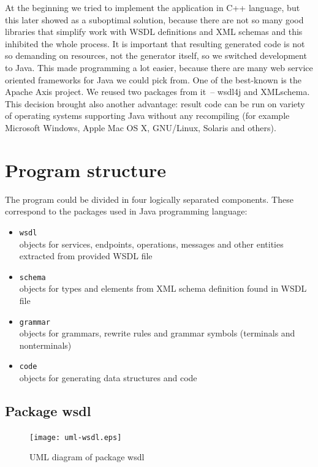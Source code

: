 \documentclass[12pt,notitlepage]{report}
\begin{document}
At the beginning we tried to implement the application in C++ language, but this later showed as a suboptimal solution, because there are not so many good libraries that simplify work with WSDL definitions and XML schemas and this inhibited the whole process. It is important that resulting generated code is not so demanding on resources, not the generator itself, so we switched development to Java. This made programming a lot easier, because there are many web service oriented frameworks for Java we could pick from. One of the best-known is the Apache Axis\cite{apache-axis} project. We reused two packages from it~-- wsdl4j and XMLschema. This decision brought also another advantage: result code can be run on variety of operating systems supporting Java without any recompiling (for example Microsoft Windows, Apple Mac OS X, GNU/Linux, Solaris and others).

\section{Program structure}
\label{program-structure}

The program could be divided in four logically separated components. These correspond to the packages used in Java programming language:

\begin{itemize}
 \item\texttt{wsdl} \\ objects for services, endpoints, operations, messages and other entities extracted from provided WSDL file
 \item\texttt{schema} \\ objects for types and elements from XML schema definition found in WSDL file
 \item\texttt{grammar} \\ objects for grammars, rewrite rules and grammar symbols (terminals and nonterminals)
 \item\texttt{code} \\ objects for generating data structures and code
\end{itemize}

\subsection{Package wsdl}

\begin{figure}[htb]
 \begin{center}
  \texttt{[image: uml-wsdl.eps]}
 \end{center}
 \caption{UML diagram of package wsdl}
 \label{uml-wsdl}
\end{figure}
\end{document}
